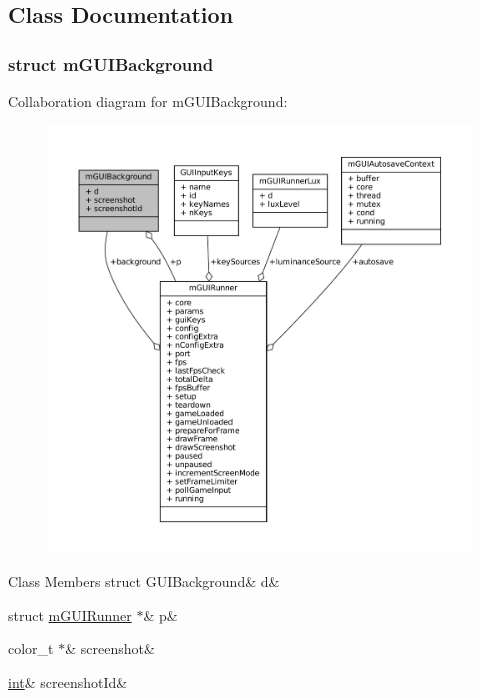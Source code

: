 \subsection{Class Documentation}
\label{structm_g_u_i_background}
\subsubsection{struct m\+G\+U\+I\+Background}


Collaboration diagram for m\+G\+U\+I\+Background\+:
\nopagebreak
\begin{figure}[H]
\begin{center}
\leavevmode
\includegraphics[width=350pt]{structm_g_u_i_background__coll__graph}
\end{center}
\end{figure}
\begin{DoxyFields}{Class Members}
\mbox{\label{gui-runner_8h_ad19787c8d810ee2098ad87d444095bc4}} 
struct GUIBackground&
d&
\\
\hline

\mbox{\label{gui-runner_8h_a421bbf1b67c109156330f9387ce1bcc7}} 
struct \mbox{\hyperlink{structm_g_u_i_runner}{mGUIRunner}} $\ast$&
p&
\\
\hline

\mbox{\label{gui-runner_8h_a86c935c6b997bf6f3c2772c5693a2ca1}} 
color\_t $\ast$&
screenshot&
\\
\hline

\mbox{\label{gui-runner_8h_a4795ed58b45e831117295a67b6aeb039}} 
\mbox{\hyperlink{ioapi_8h_a787fa3cf048117ba7123753c1e74fcd6}{int}}&
screenshotId&
\\
\hline

\end{DoxyFields}
